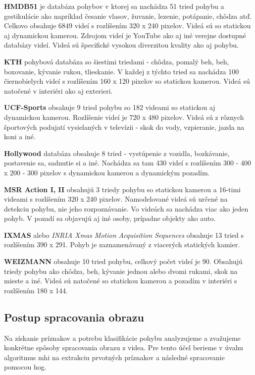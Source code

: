 \textbf{HMDB51} je databáza pohybov v ktorej sa nachádza 51 tried pohybu a gestikulácie ako napríklad česanie vlasov, žuvanie, lezenie, potápanie, chôdza atď. Celkovo obsahuje 6849 videí s rozlíšením 320 x 240 pixelov. Videá sú so statickou aj dynamickou kamerou. Zdrojom videí je YouTube ako aj iné verejne dostupné databázy videí. Videá sú špecifické vysokou diverzitou kvality ako aj pohybu.\cite{c1}

\textbf{KTH} pohybová databáza so šiestimi triedami - chôdza, pomalý beh, beh, boxovanie, kývanie rukou, tlieskanie. V každej z týchto tried sa nachádza 100 čiernobielych videí s rozlíšením 160 x 120 pixelov so statickou kamerou. Videá sú natočené v interiéri ako aj exterieri. \cite{c1}

\textbf{UCF-Sports} obsahuje 9 tried pohybu so 182 videami so statickou aj dynamickou kamerou. Rozlíšenie videí je 720 x 480 pixelov. Videá sú z rôznych športových podujatí vysielaných v televízii - skok do vody, vzpieranie, jazda na koni a iné.\cite{c1} 

\textbf{Hollywood} databáza obsahuje 8 tried - vystúpenie z vozidla, bozkávanie, postavenie sa, sadnutie si a iné. Nachádza sa tam 430 videí s rozlíšením 300 - 400 x 200 - 300 pixelov s dynamickou kamerou a dynamickým pozadím.\cite{c1}

\textbf{MSR Action I, II} obsahujú 3 triedy pohybu so statickou kamerou a 16-timi videami s  rozlíšením 320 x 240 pixelov. Namodelované videá sú určené na detekciu pohybu, nie jeho rozpoznávanie. Vo videách sa nachádza viac ako jeden pohyb. V pozadí sa objavujú aj iné osoby, prípadne objekty ako auto. \cite{c1}

\textbf{IXMAS} alebo \textit{INRIA Xmas Motion Acquisition Sequences} obsahuje 13 tried s rozlíšením 390 x 291. Pohyb je zaznamenávaný z viacerých statických kamier. \cite{c1}

\textbf{WEIZMANN} obsahuje 10 tried pohybu, celkový počet videí je 90. Obsahujú triedy pohybu ako chôdza, beh, kývanie jednou alebo dvomi rukami, skok na mieste a iné. Videá sú natočené so statickou kamerou a pozadím  v interiéri  s rozlíšením 180 x 144. \cite{c1}

\subsection{Postup spracovania obrazu}
Na získanie príznakov a potrebu klasifikácie pohybu analyzujeme a zvažujeme konkrétne spôsoby spracovania obrazu z videa. Pre tento účel berieme v úvahu algoritmus \acrfull{mhi} na extrakciu prvotných príznakov a následné spracovanie pomocou \acrfull{hog}. 

